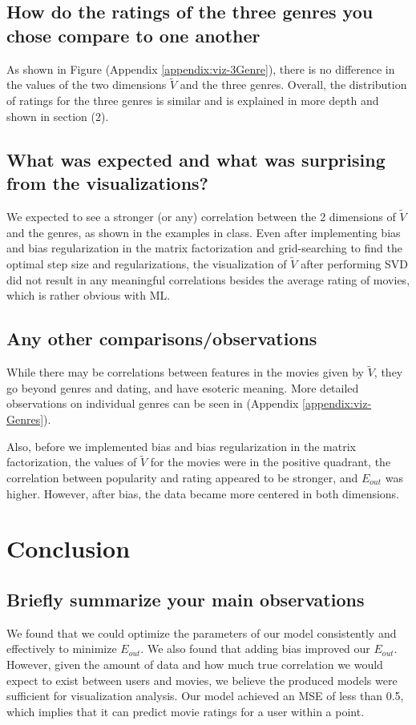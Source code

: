 \subsection*{How do the ratings of the three genres you chose compare to one another}
As shown in Figure (Appendix \ref{appendix:viz-3Genre}), there is no difference in the values of the two dimensions $\widetilde{V}$ and the three genres. Overall, the distribution of ratings for the three genres is similar and is explained in more depth and shown in section (2).

\subsection*{What was expected and what was surprising from the visualizations?}
We expected to see a stronger (or any) correlation between the 2 dimensions of $\widetilde{V}$ and the genres, as shown in the examples in class. Even after implementing bias and bias regularization in the matrix factorization and grid-searching to find the optimal step size and regularizations, the visualization of $\widetilde{V}$ after performing SVD did not result in any meaningful correlations besides the average rating of movies, which is rather obvious with ML.

\subsection*{Any other comparisons/observations}
While there may be correlations between features in the movies given by $\widetilde{V}$, they go beyond genres and dating, and have esoteric meaning. More detailed observations on individual genres can be seen in  (Appendix \ref{appendix:viz-Genres}).

Also, before we implemented bias and bias regularization in the matrix factorization, the values of $\widetilde{V}$ for the movies were in the positive quadrant, the correlation between popularity and rating appeared to be stronger, and $E_{out}$ was higher. However, after bias, the data became more centered in both dimensions.


\section{Conclusion}
\medskip
\subsection*{Briefly summarize your main observations}
We found that we could optimize the parameters of our model consistently and effectively to minimize $E_{out}$.  We also found that adding bias improved our $E_{out}$. However, given the amount of data and how much true correlation we would expect to exist between users and movies, we believe the produced models were sufficient for visualization analysis. Our model achieved an MSE of less than 0.5, which implies that it can predict movie ratings for a user within a point.
